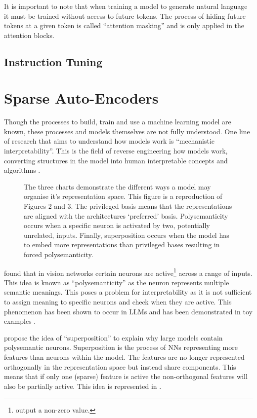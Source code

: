 It is important to note that when training a model to generate natural language it must be trained without access to future tokens.
The process of hiding future tokens at a given token is called ``attention masking'' and is only applied in the attention blocks.

\subsection{Instruction Tuning}

\section{Sparse Auto-Encoders}
\label{sec:sae}

Though the processes to build, train and use a machine learning model are known, these processes and models themselves are not fully understood.
One line of research that aims to understand how models work is ``mechanistic interpretability''.
This is the field of reverse engineering how models work, converting structures in the model into human interpretable concepts and algorithms \cite{mech-interp}.

\begin{figure}
    \centering
    \captionsetup{width=.9\textwidth}
    
    \caption{The three charts demonstrate the different ways a model may organise it's representation space. This figure is a reproduction of \citet{superposition} Figures 2 and 3. The privileged basis means that the representations are aligned with the architectures `preferred' basis. Polysemanticity occurs when a specific neuron is activated by two, potentially unrelated, inputs. Finally, superposition occurs when the model has to embed more representations than privileged bases resulting in forced polysemanticity.}
    \label{fig:superposition}
\end{figure}

\citet{polysemanticity} found that in vision networks certain neurons are active\footnote{output a non-zero value.} across a range of inputs.
This idea is known as ``polysemanticity'' as the neuron represents multiple semantic meanings.
This poses a problem for interpretability as it is not sufficient to assign meaning to specific neurons and check when they are active.
This phenomenon has been shown to occur in LLMs and has been demonstrated in toy examples \cite{superposition}.

\citet{superposition} propose the idea of ``superposition'' to explain why large models contain polysemantic neurons.
Superposition is the process of NNs representing more features than neurons within the model.
The features are no longer represented orthogonally in the representation space but instead share components.
This means that if only one (sparse) feature is active the non-orthogonal features will also be partially active.
This idea is represented in .

